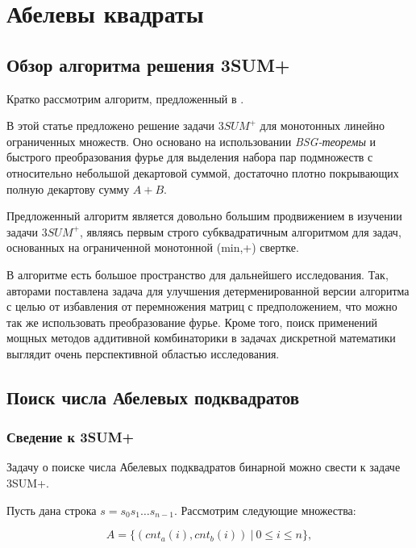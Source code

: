 \section{Абелевы квадраты}

\subsection{Обзор алгоритма решения 3SUM+}

Кратко рассмотрим алгоритм, предложенный в \cite{2}. 

В этой статье предложено решение задачи $3SUM^+$ для монотонных линейно ограниченных множеств. Оно основано на использовании \textit{BSG-теоремы} и быстрого преобразования фурье для выделения набора пар подмножеств с относительно небольшой декартовой суммой, достаточно плотно покрывающих полную декартову сумму $A+B$.

Предложенный алгоритм является довольно большим продвижением в изучении задачи $3SUM^+$, являясь первым строго субквадратичным алгоритмом для задач, основанных на ограниченной монотонной (min,+) свертке.

В алгоритме есть большое пространство для дальнейшего исследования. Так, авторами поставлена задача для улучшения детерменированной версии алгоритма с целью от избавления от перемножения матриц с предположением, что можно так же использовать преобразование фурье. Кроме того, поиск применений мощных методов аддитивной комбинаторики в задачах дискретной математики выглядит очень перспективной областью исследования.

\subsection{Поиск числа Абелевых подквадратов}

\subsubsection{Сведение к 3SUM+}
Задачу о поиске числа Абелевых подквадратов бинарной можно свести к задаче 3SUM+.

Пусть дана строка $s=s_0s_1 \ldots s_{n-1}$. Рассмотрим следующие множества:

\begin{equation}
A = \{ (cnt_a(i), cnt_b(i))\ |\ 0 \le i \le n \},
\end{equation}

